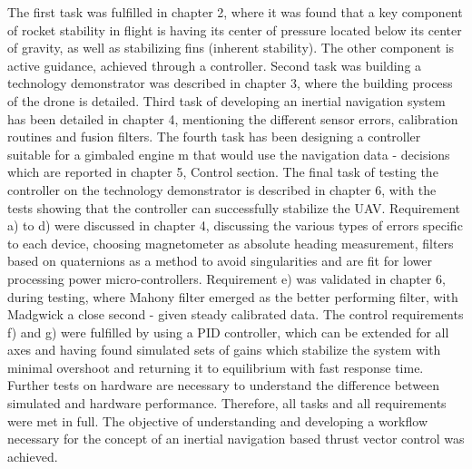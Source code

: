 The first task was fulfilled in chapter 2, where it was found that a key component of rocket stability in flight is having its center of pressure located below its center of gravity, as well as stabilizing fins (inherent stability). The other component is active guidance, achieved through a controller. 
Second task was building a technology demonstrator was described in chapter 3, where the building process of the drone is detailed. Third task of developing an inertial navigation system has been detailed in chapter 4, mentioning the different sensor errors, calibration routines and fusion filters. The fourth task has been designing a controller suitable for a gimbaled engine m that would use the navigation data - decisions which are reported in chapter 5, Control section. 
The final task of testing the controller on the technology demonstrator is described in chapter 6, with the tests showing that the controller can successfully stabilize the UAV. 
Requirement a) to d) were discussed in chapter 4, discussing the various types of errors specific to each device, choosing magnetometer as absolute heading measurement, filters based on quaternions as a method to avoid singularities and are fit for lower processing power micro-controllers. 
Requirement e) was validated in chapter 6, during testing, where Mahony filter emerged as the better performing filter, with Madgwick a close second - given steady calibrated data. 
The control requirements f) and g) were fulfilled by using a PID controller, which can be extended for all axes and having found simulated sets of gains which stabilize the system with minimal overshoot and returning it to equilibrium with fast response time. Further tests on hardware are necessary to understand the difference between simulated and hardware performance. 
Therefore, all tasks and all requirements were met in full. The objective of understanding and developing a workflow necessary for the concept of an inertial navigation based thrust vector control was achieved.
